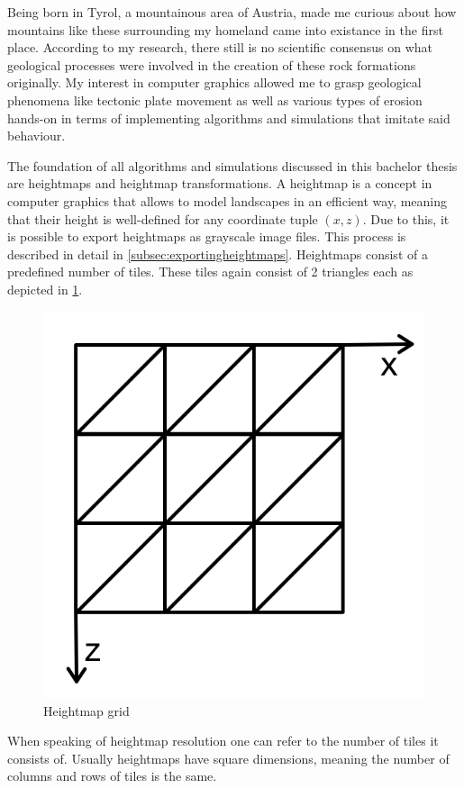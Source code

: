 \documentclass[11pt,a4paper,twoside,openright]{report}
\begin{document}
\pagestyle{fancy}

Being born in Tyrol, a mountainous area of Austria, made me curious about how mountains like these surrounding my homeland came into existance in the first place. According to my research, there still is no scientific consensus on what geological processes were involved in the creation of these rock formations originally. My interest in computer graphics allowed me to grasp geological phenomena like tectonic plate movement as well as various types of erosion hands-on in terms of implementing algorithms and simulations that imitate said behaviour.

The foundation of all algorithms and simulations discussed in this bachelor thesis are heightmaps and heightmap transformations. A heightmap is a concept in computer graphics that allows to model landscapes in an efficient way, meaning that their height is well-defined for any coordinate tuple $(x,z)$. Due to this, it is possible to export heightmaps as grayscale image files. This process is described in detail in \cref{subsec:exportingheightmaps}. Heightmaps consist of a predefined number of tiles. These tiles again consist of 2 triangles each as depicted in \cref{fig:heightmapgrid}.

\begin{figure}[h]
\centering
\includegraphics[width=0.25\linewidth]{heightmapgrid.png}
\caption{Heightmap grid}\label{fig:heightmapgrid}
\end{figure}

When speaking of heightmap resolution one can refer to the number of tiles it consists of. Usually heightmaps have square dimensions, meaning the number of columns and rows of tiles is the same.
\end{document}
